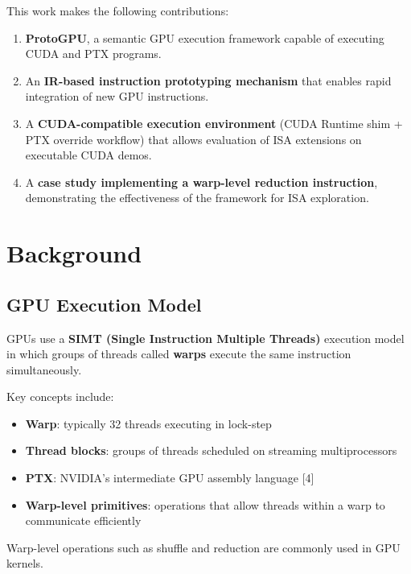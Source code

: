 \documentclass[11pt]{article}
\providecommand{\tightlist}{%
  \setlength{\itemsep}{0pt}\setlength{\parskip}{0pt}}
\begin{document}
This work makes the following contributions:

\begin{enumerate}
\def\labelenumi{\arabic{enumi}.}
\tightlist
\item
  \textbf{ProtoGPU}, a semantic GPU execution framework capable of
  executing CUDA and PTX programs.
\item
  An \textbf{IR-based instruction prototyping mechanism} that enables
  rapid integration of new GPU instructions.
\item
  A \textbf{CUDA-compatible execution environment} (CUDA Runtime shim +
  PTX override workflow) that allows evaluation of ISA extensions on
  executable CUDA demos.
\item
  A \textbf{case study implementing a warp-level reduction instruction},
  demonstrating the effectiveness of the framework for ISA exploration.
\end{enumerate}


\hypertarget{background}{%
\section{Background}\label{background}}

\hypertarget{gpu-execution-model}{%
\subsection{GPU Execution Model}\label{gpu-execution-model}}

GPUs use a \textbf{SIMT (Single Instruction Multiple Threads)} execution
model in which groups of threads called \textbf{warps} execute the same
instruction simultaneously.

Key concepts include:

\begin{itemize}
\tightlist
\item
  \textbf{Warp}: typically 32 threads executing in lock-step
\item
  \textbf{Thread blocks}: groups of threads scheduled on streaming
  multiprocessors
\item
  \textbf{PTX}: NVIDIA's intermediate GPU assembly language [4]
\item
  \textbf{Warp-level primitives}: operations that allow threads within a
  warp to communicate efficiently
\end{itemize}

Warp-level operations such as shuffle and reduction are commonly used in
GPU kernels.
\end{document}
